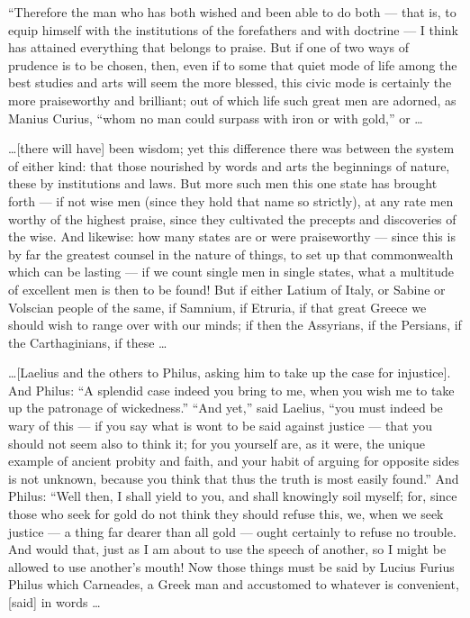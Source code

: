  ``Therefore the man who has both wished and been able to do both --- that is, to equip himself with the institutions of the forefathers and with doctrine --- I think has attained everything that belongs to praise. But if one of two ways of prudence is to be chosen, then, even if to some that quiet mode of life among the best studies and arts will seem the more blessed, this civic mode is certainly the more praiseworthy and brilliant; out of which life such great men are adorned, as Manius Curius, ``whom no man could surpass with iron or with gold,'' or \ldots

 \ldots [there will have] been wisdom; yet this difference there was between the system of either kind: that those nourished by words and arts the beginnings of nature, these by institutions and laws. But more such men this one state has brought forth --- if not wise men (since they hold that name so strictly), at any rate men worthy of the highest praise, since they cultivated the precepts and discoveries of the wise. And likewise: how many states are or were praiseworthy --- since this is by far the greatest counsel in the nature of things, to set up that commonwealth which can be lasting --- if we count single men in single states, what a multitude of excellent men is then to be found! But if either Latium of Italy, or Sabine or Volscian people of the same, if Samnium, if Etruria, if that great Greece we should wish to range over with our minds; if then the Assyrians, if the Persians, if the Carthaginians, if these \ldots

 \ldots [Laelius and the others to Philus, asking him to take up the case for injustice]. And Philus: ``A splendid case indeed you bring to me, when you wish me to take up the patronage of wickedness.'' ``And yet,'' said Laelius, ``you must indeed be wary of this --- if you say what is wont to be said against justice --- that you should not seem also to think it; for you yourself are, as it were, the unique example of ancient probity and faith, and your habit of arguing for opposite sides is not unknown, because you think that thus the truth is most easily found.'' And Philus: ``Well then, I shall yield to you, and shall knowingly soil myself; for, since those who seek for gold do not think they should refuse this, we, when we seek justice --- a thing far dearer than all gold --- ought certainly to refuse no trouble. And would that, just as I am about to use the speech of another, so I might be allowed to use another's mouth! Now those things must be said by Lucius Furius Philus which Carneades, a Greek man and accustomed to whatever is convenient, [said] in words \ldots

